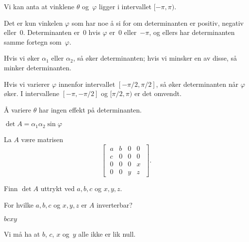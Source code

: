 \begin{losning}
Vi kan anta at vinklene $\theta$ og~$\varphi$ ligger i intervallet
$[-\pi,\pi)$.
\begin{punkt}
Det er kun vinkelen $\varphi$ som har noe å si for om determinanten er
positiv, negativ eller~$0$.  Determinanten er~$0$ hvis $\varphi$
er~$0$ eller~$-\pi$, og ellers har determinanten samme fortegn
som~$\varphi$.
\end{punkt}
\begin{punkt}
Hvis vi øker $\alpha_1$ eller $\alpha_2$, så øker determinanten; hvis
vi minsker en av disse, så minker determinanten.

Hvis vi varierer $\varphi$ innenfor intervallet $[-\pi/2, \pi/2]$, så
øker determinanten når $\varphi$ øker.  I intervallene $[-\pi,-\pi/2]$
og $[\pi/2,\pi)$ er det omvendt.

Å variere $\theta$ har ingen effekt på determinanten.
\end{punkt}
\begin{punkt}
$\det A = \alpha_1 \alpha_2 \sin \varphi$
\end{punkt}
\end{losning}



\begin{oppgave}
La $A$ være matrisen \[
\begin{bmatrix}
\;a & b & 0 & 0\;\\
\;c & 0 & 0 & 0\;\\
\;0 & 0 & 0 & x\;\\
\;0 & 0 & y & z\;
\end{bmatrix}.
\]
\begin{punkt}
Finn $\det A$ uttrykt ved $a, b, c$ og $x, y, z$.
\end{punkt}

\begin{punkt}
For hvilke $a, b, c$ og $x, y, z$ er $A$ inverterbar?
\end{punkt}
\end{oppgave}


\begin{losning}

\begin{punkt}
$bcxy$
\end{punkt}

\begin{punkt}
Vi må ha at $b$, $c$, $x$ og~$y$ alle ikke er lik null.
\end{punkt}

\end{losning}

